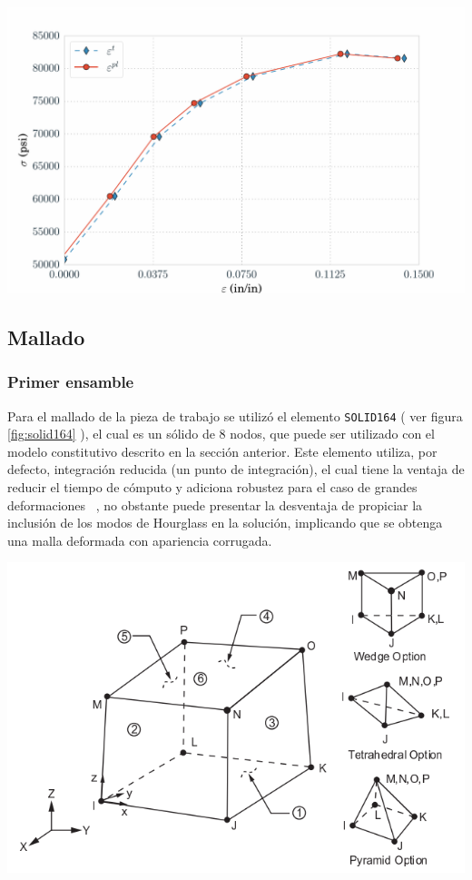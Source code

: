 \begin{center}
\includegraphics[scale=0.6]{src/ch3/ls_dyna_material_curve.pdf}
\label{fig:ls_dyna_material_curve}
\end{center}


\subsection{Mallado}

\subsubsection{Primer ensamble}

Para el mallado de la pieza de trabajo se utilizó el elemento \texttt{SOLID164} 
( ver figura \ref{fig:solid164} ), el cual es un sólido de 8 nodos, que puede ser utilizado con el modelo 
constitutivo descrito en la sección anterior. Este elemento utiliza, por defecto, integración reducida 
(un punto de integración), el cual tiene la ventaja de reducir el tiempo de cómputo y adiciona 
robustez para el caso de grandes deformaciones ~\cite{lsdyna-ansys-manual}, no obstante puede presentar 
la desventaja de propiciar la inclusión de los modos de Hourglass en la solución, implicando que 
se obtenga una malla deformada con apariencia corrugada.

\begin{center}
\includegraphics[scale=0.65]{src/ch3/solid164.png}
\label{fig:solid164}
\end{center}

